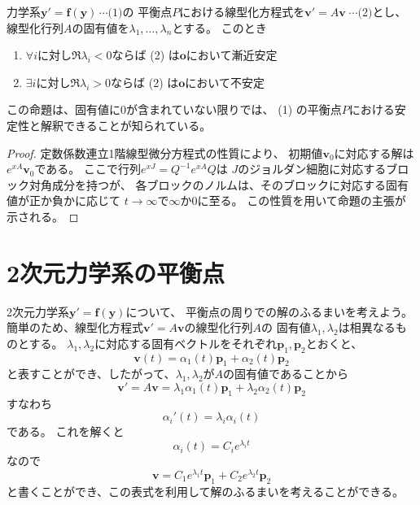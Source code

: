 \documentclass[report]{jlreq}
\begin{document}
\begin{proposition}[5.2.2]
    力学系$\bm{y}' = \bm{f}(\bm{y})\,\cdots\text{(1)}$の
    平衡点$P$における線型化方程式を$\bm{v}' = A \bm{v} \; \cdots \text{(2)}$とし、
    線型化行列$A$の固有値を$\lambda_1, \dots, \lambda_n$とする。
    このとき
    \begin{enumerate}
        \item $\forall i$に対し$\Re \lambda_i < 0$ならば
            (2) は$\bm{o}$において漸近安定
        \item $\exists i$に対し$\Re \lambda_i > 0$ならば
            (2) は$\bm{o}$において不安定
    \end{enumerate}
\end{proposition}

この命題は、固有値に$0$が含まれていない限りでは、
(1) の平衡点$P$における安定性と解釈できることが知られている。

\begin{proof}
    定数係数連立1階線型微分方程式の性質により、
    初期値$\bm{v}_0$に対応する解は$e^{xA} \bm{v}_0$である。
    ここで行列$e^{xJ} = Q^{-1} e^{xA} Q$は
    $J$のジョルダン細胞に対応するブロック対角成分を持つが、
    各ブロックのノルムは、そのブロックに対応する固有値が正か負かに応じて
    $t \to \infty$で$\infty$か$0$に至る。
    この性質を用いて命題の主張が示される。
\end{proof}





\section{2次元力学系の平衡点}

2次元力学系$\bm{y}' = \bm{f}(\bm{y})$について、
平衡点の周りでの解のふるまいを考えよう。
簡単のため、線型化方程式$\bm{v}' = A \bm{v}$の線型化行列$A$の
固有値$\lambda_1, \lambda_2$は相異なるものとする。
$\lambda_1, \lambda_2$に対応する固有ベクトルをそれぞれ$\bm{p}_1, \bm{p}_2$とおくと、
\begin{equation}
    \bm{v}(t) = \alpha_1(t) \bm{p}_1 + \alpha_2(t) \bm{p}_2
\end{equation}
と表すことができ、したがって、$\lambda_1, \lambda_2$が$A$の固有値であることから
\begin{equation}
    \bm{v}' = A \bm{v}
        = \lambda_1 \alpha_1(t) \bm{p}_1
        + \lambda_2 \alpha_2(t) \bm{p}_2
\end{equation}
すなわち
\begin{equation}
    \alpha_i'(t) = \lambda_i \alpha_i(t)
\end{equation}
である。
これを解くと
\begin{equation}
    \alpha_i(t) = C_i e^{\lambda_i t}
\end{equation}
なので
\begin{equation}
    \bm{v}
        = C_1 e^{\lambda_1 t} \bm{p}_1
        + C_2 e^{\lambda_2 t} \bm{p}_2
\end{equation}
と書くことができ、この表式を利用して解のふるまいを考えることができる。
\end{document}
